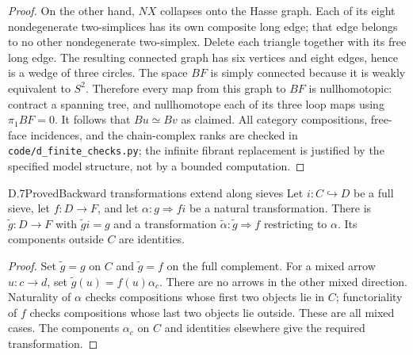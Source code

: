 \begin{proof}
On the other hand, $NX$ collapses onto the Hasse graph. Each of its eight nondegenerate two-simplices has its own composite long edge; that edge belongs to no other nondegenerate two-simplex. Delete each triangle together with its free long edge. The resulting connected graph has six vertices and eight edges, hence is a wedge of three circles. The space $BF$ is simply connected because it is weakly equivalent to $S^2$. Therefore every map from this graph to $BF$ is nullhomotopic: contract a spanning tree, and nullhomotope each of its three loop maps using $\pi_1BF=0$. It follows that $Bu\simeq Bv$ as claimed. All category compositions, free-face incidences, and the chain-complex ranks are checked in \texttt{code/d\_finite\_checks.py}; the infinite fibrant replacement is justified by the specified model structure, not by a bounded computation.
\end{proof}


\begin{claim}{D.7}{Proved}{Backward transformations extend along sieves}
Let $i:C\hookrightarrow D$ be a full sieve, let $f:D\to F$, and let $\alpha:g\Rightarrow fi$ be a natural transformation. There is $\widetilde g:D\to F$ with $\widetilde g i=g$ and a transformation $\widetilde\alpha:\widetilde g\Rightarrow f$ restricting to $\alpha$. Its components outside $C$ are identities.
\end{claim}
\begin{proof}
Set $\widetilde g=g$ on $C$ and $\widetilde g=f$ on the full complement. For a mixed arrow $u:c\to d$, set $\widetilde g(u)=f(u)\alpha_c$. There are no arrows in the other mixed direction. Naturality of $\alpha$ checks compositions whose first two objects lie in $C$; functoriality of $f$ checks compositions whose last two objects lie outside. These are all mixed cases. The components $\alpha_c$ on $C$ and identities elsewhere give the required transformation.
\end{proof}

